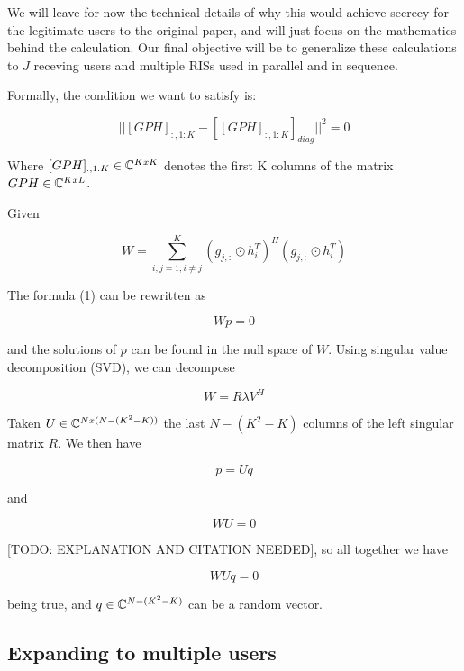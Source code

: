 We will leave for now the technical details of why this would achieve secrecy for the legitimate users to the original paper, and will just focus on the mathematics behind the calculation. Our final objective will be to generalize these calculations to $J$ receving users and multiple RISs used in parallel and in sequence.

Formally, the condition we want to satisfy is:

\begin{equation}
  || [GPH]_{:,1:K} - [[GPH]_{:,1:K}]_{diag} || ^2 = 0
\end{equation}

Where $[GPH]_{:,1:K} \in \mathbb{C}^{KxK}$ denotes the first K columns of the matrix $GPH \in \mathbb{C}^{KxL}$.

Given

\begin{equation}
  W = \sum_{i,j = 1, i \ne j}^{K} (g_{j,:} \odot h_i^T)^H (g_{j,:} \odot h_i^T)
\end{equation}

The formula (1) can be rewritten as

\begin{equation}
  Wp = 0
\end{equation}

and the solutions of $p$ can be found in the null space of $W$. Using singular value decomposition (SVD), we can decompose

\begin{equation}
  W = R \lambda V^H
\end{equation}

Taken $U \in \mathbb{C} ^ {Nx(N-(K^2 - K))}$ the last $N-(K^2 - K)$ columns of the left singular matrix $R$. We then have

\begin{equation} p = Uq \end{equation}

and

\begin{equation}WU = 0\end{equation}

[TODO: EXPLANATION AND CITATION NEEDED], so all together we have

\begin{equation}
  WUq = 0
\end{equation}

being true, and $q \in \mathbb{C}^{N-(K^2 - K)}$ can be a random vector.

\subsection{Expanding to multiple users}

